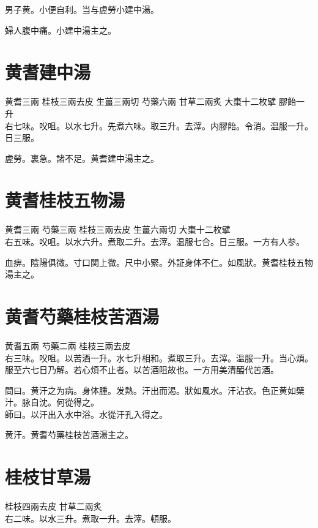 男子黄。小便自利。当与虗勞小建中湯。

婦人腹中痛。小建中湯主之。

\section{黄耆建中湯}

黄耆{\scriptsize 三兩} 桂枝{\scriptsize 三兩去皮} 生薑{\scriptsize 三兩切} 芍藥{\scriptsize 六兩} 甘草{\scriptsize 二兩炙} 大棗{\scriptsize 十二枚擘} 膠飴{\scriptsize 一升}\\
右七味。㕮咀。以水七升。先煮六味。取三升。去滓。内膠飴。令消。温服一升。日三服。

虗勞。裏急。諸不足。黄耆建中湯主之。

\section{黄耆桂枝五物湯}

黄耆{\scriptsize 三兩} 芍藥{\scriptsize 三兩} 桂枝{\scriptsize 三兩去皮} 生薑{\scriptsize 六兩切} 大棗{\scriptsize 十二枚擘}\\
右五味。㕮咀。以水六升。煮取二升。去滓。温服七合。日三服。{\scriptsize 一方有人参。}

血痹。陰陽俱微。寸口関上微。尺中小緊。外証身体不仁。如風狀。黄耆桂枝五物湯主之。

\section{黄耆芍藥桂枝苦酒湯}

黄耆{\scriptsize 五兩} 芍藥{\scriptsize 二兩} 桂枝{\scriptsize 三兩去皮}\\
右三味。㕮咀。以苦酒一升。水七升相和。煮取三升。去滓。温服一升。当心煩。服至六七日乃解。若心煩不止者。以苦酒阻故也。{\scriptsize 一方用美清醯代苦酒。}

問曰。黄汗之为病。身体腫。发熱。汗出而渴。狀如風水。汗沾衣。色正黄如檗汁。脉自沈。何從得之。\\
師曰。以汗出入水中浴。水從汗孔入得之。

黄汗。黄耆芍藥桂枝苦酒湯主之。

\section{桂枝甘草湯}

桂枝{\scriptsize 四兩去皮} 甘草{\scriptsize 二兩炙}\\
右二味。以水三升。煮取一升。去滓。頓服。


